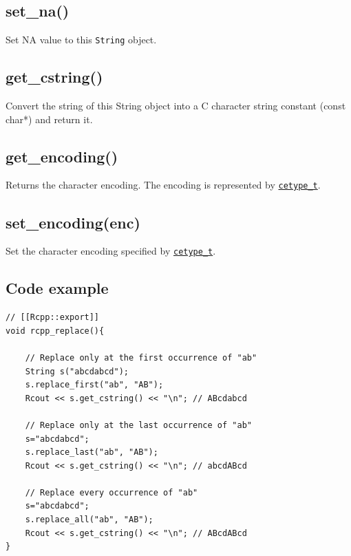\documentclass[]{book}
\begin{document}
\hypertarget{set_na}{%
\subsection{set\_na()}\label{set_na}}

Set NA value to this \texttt{String} object.

\hypertarget{get_cstring}{%
\subsection{get\_cstring()}\label{get_cstring}}

Convert the string of this String object into a C character string constant (const char*) and return it.

\hypertarget{get_encoding}{%
\subsection{get\_encoding()}\label{get_encoding}}

Returns the character encoding. The encoding is represented by \href{https://github.com/wch/r-source/blob/bf0a0a9d12f2ce5d66673dc32cd253524f3270bf/src/include/Rinternals.h\#L928-L935}{\texttt{cetype\_t}}.

\hypertarget{set_encodingenc}{%
\subsection{set\_encoding(enc)}\label{set_encodingenc}}

Set the character encoding specified by \href{https://github.com/wch/r-source/blob/bf0a0a9d12f2ce5d66673dc32cd253524f3270bf/src/include/Rinternals.h\#L928-L935}{\texttt{cetype\_t}}.

\hypertarget{code-example}{%
\subsection{Code example}\label{code-example}}

\begin{verbatim}
// [[Rcpp::export]]
void rcpp_replace(){

    // Replace only at the first occurrence of "ab"
    String s("abcdabcd");
    s.replace_first("ab", "AB");
    Rcout << s.get_cstring() << "\n"; // ABcdabcd

    // Replace only at the last occurrence of "ab"
    s="abcdabcd";
    s.replace_last("ab", "AB");
    Rcout << s.get_cstring() << "\n"; // abcdABcd

    // Replace every occurrence of "ab"
    s="abcdabcd";
    s.replace_all("ab", "AB");
    Rcout << s.get_cstring() << "\n"; // ABcdABcd
}
\end{verbatim}
\end{document}
